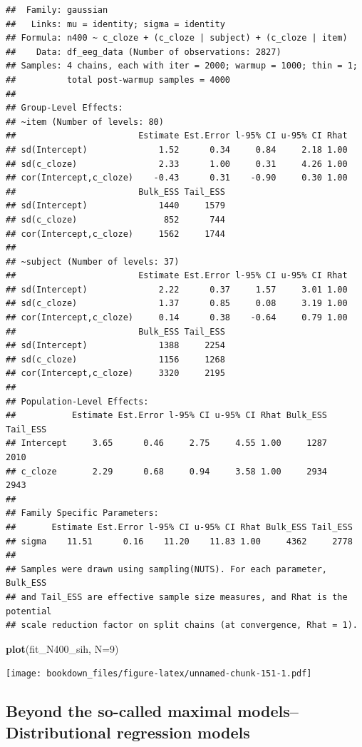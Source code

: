 \documentclass[12pt,]{krantz}
\newenvironment{Shaded}{\begin{snugshade}}{\end{snugshade}}
\newcommand{\DataTypeTok}[1]{\textcolor[rgb]{0.13,0.29,0.53}{#1}}
\newcommand{\DecValTok}[1]{\textcolor[rgb]{0.00,0.00,0.81}{#1}}
\newcommand{\KeywordTok}[1]{\textcolor[rgb]{0.13,0.29,0.53}{\textbf{#1}}}
\newcommand{\NormalTok}[1]{#1}
\theoremstyle{definition}
\theoremstyle{definition}
\theoremstyle{definition}
\theoremstyle{remark}
\begin{document}
\begin{verbatim}
##  Family: gaussian 
##   Links: mu = identity; sigma = identity 
## Formula: n400 ~ c_cloze + (c_cloze | subject) + (c_cloze | item) 
##    Data: df_eeg_data (Number of observations: 2827) 
## Samples: 4 chains, each with iter = 2000; warmup = 1000; thin = 1;
##          total post-warmup samples = 4000
## 
## Group-Level Effects: 
## ~item (Number of levels: 80) 
##                        Estimate Est.Error l-95% CI u-95% CI Rhat
## sd(Intercept)              1.52      0.34     0.84     2.18 1.00
## sd(c_cloze)                2.33      1.00     0.31     4.26 1.00
## cor(Intercept,c_cloze)    -0.43      0.31    -0.90     0.30 1.00
##                        Bulk_ESS Tail_ESS
## sd(Intercept)              1440     1579
## sd(c_cloze)                 852      744
## cor(Intercept,c_cloze)     1562     1744
## 
## ~subject (Number of levels: 37) 
##                        Estimate Est.Error l-95% CI u-95% CI Rhat
## sd(Intercept)              2.22      0.37     1.57     3.01 1.00
## sd(c_cloze)                1.37      0.85     0.08     3.19 1.00
## cor(Intercept,c_cloze)     0.14      0.38    -0.64     0.79 1.00
##                        Bulk_ESS Tail_ESS
## sd(Intercept)              1388     2254
## sd(c_cloze)                1156     1268
## cor(Intercept,c_cloze)     3320     2195
## 
## Population-Level Effects: 
##           Estimate Est.Error l-95% CI u-95% CI Rhat Bulk_ESS Tail_ESS
## Intercept     3.65      0.46     2.75     4.55 1.00     1287     2010
## c_cloze       2.29      0.68     0.94     3.58 1.00     2934     2943
## 
## Family Specific Parameters: 
##       Estimate Est.Error l-95% CI u-95% CI Rhat Bulk_ESS Tail_ESS
## sigma    11.51      0.16    11.20    11.83 1.00     4362     2778
## 
## Samples were drawn using sampling(NUTS). For each parameter, Bulk_ESS
## and Tail_ESS are effective sample size measures, and Rhat is the potential
## scale reduction factor on split chains (at convergence, Rhat = 1).
\end{verbatim}

\begin{Shaded}
\begin{Highlighting}[]
\KeywordTok{plot}\NormalTok{(fit_N400_sih, }\DataTypeTok{N=}\DecValTok{9}\NormalTok{)}
\end{Highlighting}
\end{Shaded}

\texttt{[image: bookdown\_files/figure-latex/unnamed-chunk-151-1.pdf]}

\hypertarget{sec:distrmodel}{%
\subsection{Beyond the so-called maximal models--Distributional regression models}\label{sec:distrmodel}}
\end{document}
